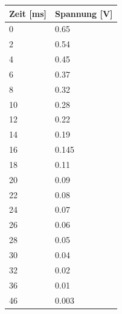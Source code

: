 \begin{minipage}{\linewidth}
    \begin{table}[H]
        \centering
    \begin{tabular}{ll}
        \toprule
        Zeit [ms] & Spannung [V]  \\
        \midrule
        0      & 0.65 \\
        2      & 0.54 \\
        4      & 0.45 \\
        6      & 0.37 \\
        8      & 0.32 \\
        10     & 0.28 \\
        12     & 0.22 \\
        14     & 0.19 \\
        16     & 0.145\\
        18     & 0.11 \\
        20     & 0.09 \\
        22     & 0.08 \\
        24     & 0.07 \\
        26     & 0.06 \\
        28     & 0.05 \\
        30     & 0.04 \\
        32     & 0.02 \\
        36     & 0.01 \\
        46     & 0.003\\
        \bottomrule   
    \end{tabular}
    
    \label{tab:1}
\end{table}
\end{minipage}
